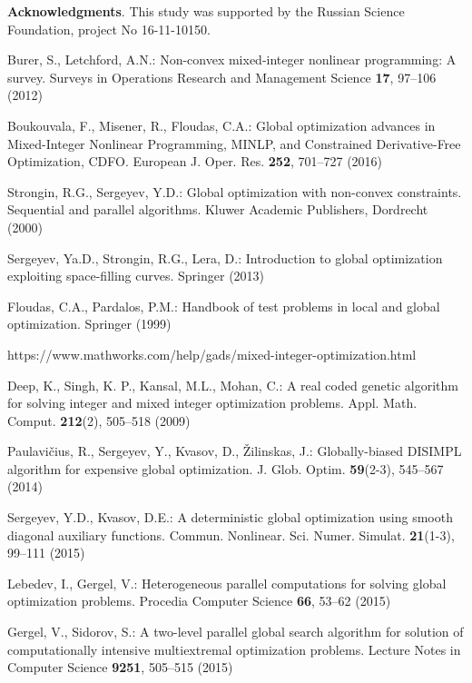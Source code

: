 \documentclass{llncs}
\begin{document}
\textbf{Acknowledgments}. This study was supported by the Russian Science Foundation, project No 16-11-10150.

\begin{thebibliography}{10}

Burer, S., Letchford, A.N.: Non-convex mixed-integer nonlinear programming: A survey. Surveys in Operations Research and Management Science \textbf{17}, 97--106 (2012) 

Boukouvala, F., Misener, R., Floudas, C.A.: Global optimization advances in Mixed-Integer Nonlinear Programming, MINLP, and Constrained Derivative-Free Optimization, CDFO. European J. Oper. Res. \textbf{252}, 701--727 (2016) 

Strongin, R.G., Sergeyev, Y.D.: Global optimization with non-convex constraints. Sequential and parallel algorithms. Kluwer Academic Publishers, Dordrecht (2000) %

Sergeyev, Ya.D., Strongin, R.G., Lera, D.: Introduction to global optimization exploiting space-filling curves. Springer (2013) %

Floudas, C.A., Pardalos, P.M.:  Handbook of test problems in local and global optimization. Springer (1999)  %

https://www.mathworks.com/help/gads/mixed-integer-optimization.html

Deep, K., Singh, K. P., Kansal, M.L., Mohan, C.: A real coded genetic algorithm for solving integer and mixed integer optimization problems. Appl. Math. Comput. \textbf{212}(2), 505--518 (2009)


Paulavi\v{c}ius, R., Sergeyev, Y., Kvasov, D., \v{Z}ilinskas, J.: Globally-biased DISIMPL algorithm for expensive global optimization. J. Glob. Optim. \textbf{59}(2-3), 545--567 (2014)

Sergeyev, Y.D., Kvasov, D.E.: A deterministic global optimization using smooth diagonal auxiliary functions. Commun. Nonlinear. Sci. Numer. Simulat. \textbf{21}(1-3), 99--111 (2015)

Lebedev, I., Gergel, V.: Heterogeneous parallel computations for solving global optimization problems. Procedia Computer Science \textbf{66}, 53--62 (2015)

Gergel, V., Sidorov, S.: A two-level parallel global search algorithm for solution of computationally intensive multiextremal optimization problems. Lecture Notes in Computer Science  \textbf{9251}, 505--515 (2015)


\end{thebibliography}
\end{document}
